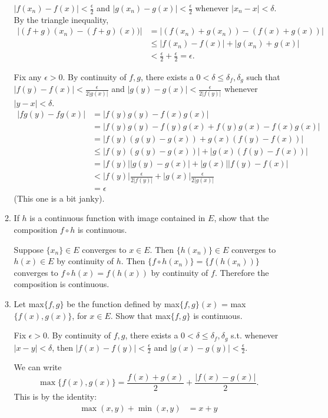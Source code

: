 \begin{enumerate}
\begin{enumerate}[label=(\roman*),align=left]
		$|f(x_n)-f(x)|<\frac{\epsilon}{2}$ and $|g(x_n)-g(x)|<\frac{\epsilon}{2}$ whenever $|x_n-x|<\delta$.
		By the triangle inequality,
		\begin{align*}
			|(f+g)(x_n)-(f+g)(x))| &= |(f(x_n)+g(x_n))-(f(x)+g(x))| \\
			&\le |f(x_n)-f(x)|+|g(x_n)+g(x)| \\
			&< \frac{\epsilon}{2} + \frac{\epsilon}{2} = \epsilon.
		\end{align*}
        \par
		Fix any $\epsilon>0$. By continuity of $f,g$, there exists a $0<\delta\le \delta_f,\delta_g$ such that
		$|f(y)-f(x)|<\frac{\epsilon}{2|g(x)|}$ and $|g(y)-g(x)|<\frac{\epsilon}{2|f(y)|}$ whenever $|y-x|<\delta$.
		\begin{align*}
			|fg(y)-fg(x)| &= |f(y)g(y)-f(x)g(x)|\\
			&=|f(y)g(y)-f(y)g(x)+f(y)g(x)-f(x)g(x)|\\
			&=|f(y)(g(y)-g(x))+g(x)(f(y)-f(x))|\\
			&\le|f(y)(g(y)-g(x))|+|g(x)(f(y)-f(x))|\\
			&=|f(y)||g(y)-g(x)|+|g(x)||f(y)-f(x)|\\
			&<|f(y)|\frac{\epsilon}{2|f(y)|}+|g(x)|\frac{\epsilon}{2|g(x)|}\\
			&=\epsilon
		\end{align*}
        (This one is a bit janky).
        \item If $h$ is a continuous function with image contained in $E$, show that the composition $f \circ h$ is continuous.\par
        Suppose $\{x_n\}\in E$ converges to $x\in E$.
		Then $\{h(x_n)\}\in E$ converges to $h(x)\in E$ by continuity of $h$.
		Then $\{f\circ h(x_n)\}=\{f(h(x_n))\}$ converges to $f\circ h(x) = f(h(x))$ by continuity of $f$.
		Therefore the composition is continuous.
        \item Let max$\{f,g\}$ be the function defined by max$\{f,g\}(x)$ = max$\{f(x),g(x)\}$, for $x \in E$. Show that max$\{f,g\}$ is continuous.\par
        Fix $\epsilon>0$. By continuity of $f,g$, there exists a $0<\delta\le\delta_f,\delta_g$ s.t. whenever $|x-y|<\delta$, then $|f(x)-f(y)|<\frac{\epsilon}{2}$ and $|g(x)-g(y)|<\frac{\epsilon}{2}$.
		\par
		We can write
		\[
			\max\{f(x),g(x)\} = \frac{f(x)+g(x)}{2}+\frac{|f(x)-g(x)|}{2}.
		\]
		This is by the identity:
		\begin{align*}
		\max(x,y)+\min(x,y)&=x+y\\

\end{align*}
\end{enumerate}
\end{enumerate}
